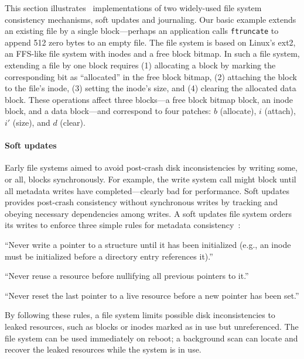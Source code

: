 This section illustrates \patch\ implementations of two widely-used
 file system consistency mechanisms, soft updates and journaling.
%
Our basic example extends an existing file by a single block---perhaps an
 application calls \texttt{ftruncate} to append 512 zero bytes to an
 empty file.
%
The file system is based on Linux's ext2, an FFS-like file system with inodes and
 a free block bitmap.
%
In such a file system, extending a file by one block requires (1) allocating a block by
 marking the corresponding bit as ``allocated'' in the free block bitmap,
 (2) attaching the block to the file's inode, (3) setting the inode's size,
 and (4) clearing the allocated data block.
%
These operations affect three blocks---a free block bitmap block, an inode
 block, and a data block---and correspond to four patches: $b$ (allocate),
 $i$ (attach), $i'$ (size), and $d$ (clear).


\paragraph{Soft updates}
%
Early file systems aimed to avoid post-crash disk inconsistencies by
 writing some, or all, blocks synchronously.
%
For example, the write system call might block until all metadata writes
 have completed---clearly bad for performance.
%
Soft updates provides post-crash consistency without
 synchronous writes by tracking and obeying necessary dependencies among
 writes.
%
A soft updates file system orders its writes to enforce three simple rules
 for metadata consistency~\cite{ganger00soft}:

\begin{compactenumerate}
\item \label{rule:pointer} ``Never write a pointer to a structure until it
 has been initialized (e.g., an inode must be initialized before a
 directory entry references it).''
\item \label{rule:reuse} ``Never reuse a resource before nullifying all
 previous pointers to it.''
\item \label{rule:overwrite} ``Never reset the last pointer to a live
 resource before a new pointer has been set.''
\end{compactenumerate}

\noindent
By following these rules, a file system limits possible disk inconsistencies
to leaked resources, such as blocks or inodes
marked as in use but unreferenced. The file system can be used immediately
 on reboot; a background scan can locate and recover the leaked resources
 while the system is in use.


